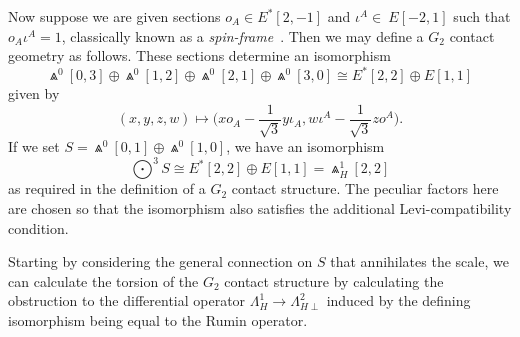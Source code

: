 \documentclass[pdftex]{sigma}%
\numberwithin{equation}{section}
\begin{document}
Now suppose we are given sections
$o_A\in E^*[2,-1]$ and $\iota^A\in\ E[-2,1]$ such that
$o_A\iota^A = 1$,
classically known as a {\em spin-frame}~\cite[pp.~110--115]{OT}. Then we
may define a $G_2$ contact geometry as follows. These sections determine an
isomorphism
\[\Wedge^0[0,3] \oplus \Wedge^0[1,2] \oplus \Wedge^0[2,1] \oplus \Wedge^0[3,0]
\cong
E^*[2,2] \oplus E[1,1]\]
given by
\begin{equation}\textstyle\label{defining_isomorphism}
(x,y,z,w)\longmapsto
\big(xo_A-\frac{1}{\sqrt{3}}y\iota_A,w\iota^A-\frac{1}{\sqrt{3}}zo^A\big).
\end{equation}
If we set
$S = \Wedge^0[0,1] \oplus \Wedge^0[1,0]$,
we have an isomorphism
\[\textstyle\bigodot^3\!S\cong E^*[2,2] \oplus E[1,1] = \Wedge_H^1[2,2]\]
as required in the definition of a $G_2$ contact structure. The peculiar
factors here are chosen so that the isomorphism also satisfies the additional
Levi-compatibility condition.

Starting by considering the general connection on $S$ that
annihilates the scale, we can calculate the torsion of the $G_2$ contact
structure by calculating the obstruction to the differential operator
$\Lambda_H^1 \to \Lambda_{H\perp}^2$ induced by the defining isomorphism being
equal to the Rumin operator.
\end{document}
